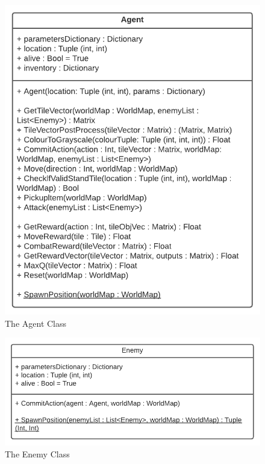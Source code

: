 \begin{flushleft}
\begin{figure}[H]
                    \includegraphics[width=.65\textwidth]{Images/Design/Classes/Agent.png}
                    \caption*{The Agent Class}
                \end{figure}
                \begin{figure}[H]
                    \centering
                    \includegraphics[width=.80\textwidth]{Images/Design/Classes/Enemy.png}
                    \caption*{The Enemy Class}
                \end{figure}

\end{flushleft}
